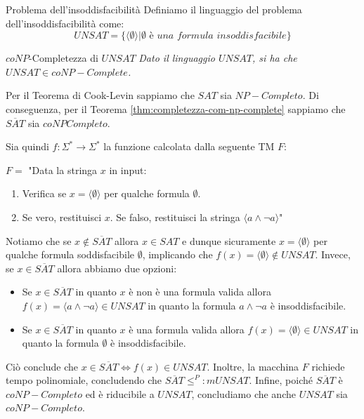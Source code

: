 \begin{Definition}{Problema dell’insoddisfacibilità}{}
Definiamo il linguaggio del problema dell’insoddisfacibilità come:
\begin{equation*}
    UNSAT = \{\langle\emptyset\rangle | \emptyset\textit{ è una formula insoddisfacibile}\}
\end{equation*}
\end{Definition}

\begin{Thm}{$coNP$-Completezza di $UNSAT$}{}
\textit{Dato il linguaggio $UNSAT$, si ha che $UNSAT\in coNP-Complete$.}
\begin{demonstration}
Per il Teorema di Cook-Levin sappiamo che $SAT$ sia $NP-Completo$. Di conseguenza,
per il Teorema \ref{thm:completezza-com-np-complete} sappiamo che $\overline{SAT}$ sia $coNPCompleto$.

Sia quindi $f : \Sigma^*\to \Sigma^*$ la funzione calcolata dalla seguente TM $F$:

$F =$ "Data la stringa $x$ in input:
\begin{enumerate}
    \item Verifica se $x = \langle\emptyset\rangle$ per qualche formula $\emptyset$.
    \item Se vero, restituisci $x$. Se falso, restituisci la stringa $\langle a\land \lnot a\rangle$"
\end{enumerate}
Notiamo che se $x\notin \overline{SAT}$ allora $x\in SAT$ e dunque sicuramente $x = \langle\emptyset\rangle$ per qualche formula soddisfacibile $\emptyset$, implicando che $f(x) = \langle\emptyset\rangle\notin UNSAT$. Invece, se $x\in \overline{SAT}$ allora abbiamo due opzioni:
\begin{itemize}
    \item Se $x\in \overline{SAT}$ in quanto $x$ è non è una formula valida allora $f(x) = \langle a \land \lnot a\rangle\in UNSAT$ in quanto la formula $a\land \lnot a$ è insoddisfacibile.
    \item Se $x\in \overline{SAT}$ in quanto $x$ è una formula valida allora $f(x) = \langle\emptyset\rangle\in UNSAT$ in quanto la formula $\emptyset$ è insoddisfacibile.
\end{itemize}
Ciò conclude che $x\in \overline{SAT}\iff f(x)\in UNSAT$. Inoltre, la macchina $F$ richiede tempo polinomiale, concludendo che $\overline{SAT}\leq^P:m UNSAT$. Infine, poiché $\overline{SAT}$ è $coNP-Completo$ ed è riducibile a $UNSAT$, concludiamo che anche $UNSAT$ sia
$coNP-Completo$.
\end{demonstration}
\end{Thm}